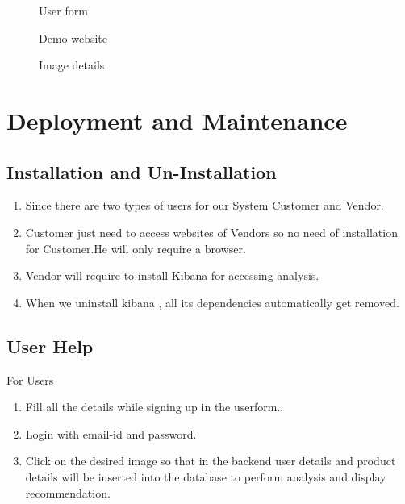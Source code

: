 \documentclass[oneside,a4paper,12pt]{book}
\begin{document}
\begin{enumerate}
\begin{itemize}
\begin{center}
\begin{figure}[!htbp]
	\end{figure}
\end{center}
\begin{center}
	\begin{figure}[!htbp]
		\centering
	     \caption{User form}
	  \label{fig:User form}
	\end{figure}
\end{center}
\begin{center}
	\begin{figure}[!htbp]
		\centering
	   \caption{Demo website}
	  \label{fig:Demo website}
	\end{figure}
\end{center}
\begin{center}
	\begin{figure}[!htbp]
		\centering
	  \caption{Image details}
	  \label{fig:Image details}
	\end{figure}
\end{center}
 \begin{center}
	\begin{figure}[!htbp]
		\centering
	  \label{fig:Analysis}
	\end{figure}
\end{center}
 

\chapter{Deployment and Maintenance}
     \section{Installation and Un-Installation}
     \begin{enumerate}
\item Since there are two types of users for our System Customer and Vendor.
\item Customer just need to access websites of Vendors so no need of installation for Customer.He will only require a browser.
\item Vendor will require to install Kibana for accessing analysis.
\item When we uninstall kibana , all its dependencies automatically get removed.
\end{enumerate}

\section{User Help}
For Users
     \begin{enumerate}
\item Fill all the details while signing up in the userform..
\item Login with email-id and password.
\item Click on the desired image so that in the backend user details and product details will be inserted into the database to perform analysis and display recommendation.
\end{enumerate}


\end{itemize}
\end{enumerate}
\end{document}
